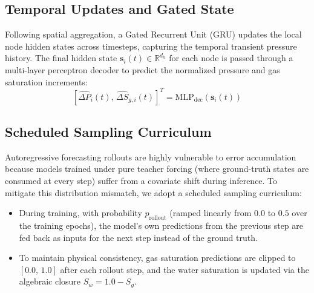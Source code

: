 \subsection{Temporal Updates and Gated State}
Following spatial aggregation, a Gated Recurrent Unit (GRU) updates the local node hidden states across timesteps, capturing the temporal transient pressure history. The final hidden state $\mathbf{s}_i(t) \in \mathbb{R}^{d_h}$ for each node is passed through a multi-layer perceptron decoder to predict the normalized pressure and gas saturation increments:
\begin{equation}
\label{eq:decoder}
\left[\widehat{\Delta P}_i(t),\, \widehat{\Delta S}_{g,i}(t)\right]^T = \text{MLP}_{\text{dec}} \left( \mathbf{s}_i(t) \right)
\end{equation}

\subsection{Scheduled Sampling Curriculum}
Autoregressive forecasting rollouts are highly vulnerable to error accumulation because models trained under pure teacher forcing (where ground-truth states are consumed at every step) suffer from a covariate shift during inference. To mitigate this distribution mismatch, we adopt a scheduled sampling curriculum:
\begin{itemize}
    \item During training, with probability $p_{\text{rollout}}$ (ramped linearly from $0.0$ to $0.5$ over the training epochs), the model's own predictions from the previous step are fed back as inputs for the next step instead of the ground truth.
    \item To maintain physical consistency, gas saturation predictions are clipped to $[0.0,\, 1.0]$ after each rollout step, and the water saturation is updated via the algebraic closure $S_w = 1.0 - S_g$.
\end{itemize}

